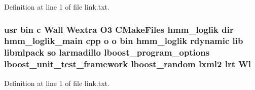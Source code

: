 Definition at line 1 of file link.\-txt.

\subsubsection[{Wl}]{\setlength{\rightskip}{0pt plus 5cm}usr bin c Wall Wextra O3 C\-Make\-Files hmm\-\_\-loglik dir hmm\-\_\-loglik\-\_\-main cpp o o bin hmm\-\_\-loglik rdynamic lib libmlpack so larmadillo lboost\-\_\-program\-\_\-options lboost\-\_\-unit\-\_\-test\-\_\-framework lboost\-\_\-random lxml2 lrt Wl}\label{methods_2hmm_2CMakeFiles_2hmm__loglik_8dir_2link_8txt_a6b59401645f0b18c9fb0b1fdb1a5d448}


Definition at line 1 of file link.\-txt.

